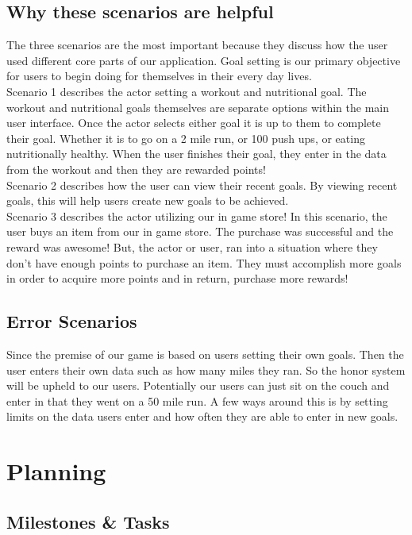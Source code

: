 \documentclass[a4paper]{article}
\begin{document}
\subsection{Why these scenarios are helpful}
The three scenarios are the most important because they discuss how the user used different core parts of our application. Goal setting is our primary objective for users to begin doing for themselves in their every day lives. \newline
\\ Scenario 1 describes the actor setting a workout and nutritional goal. The workout and nutritional goals themselves are separate options within the main user interface. Once the actor selects either goal it is up to them to complete their goal. Whether it is to go on a 2 mile run, or 100 push ups, or eating nutritionally healthy. When the user finishes their goal, they enter in the data from the workout and then they are rewarded points! \newline
\\ Scenario 2 describes how the user can view their recent goals. By viewing recent goals, this will help users create new goals to be achieved.\newline 
\\ Scenario 3 describes the actor utilizing our in game store! In this scenario, the user buys an item from our in game store. The purchase was successful and the reward was awesome! But, the actor or user, ran into a situation where they don't have enough points to purchase an item. They must accomplish more goals in order to acquire more points and in return, purchase more rewards! 

\subsection{Error Scenarios}
Since the premise of our game is based on users setting their own goals. Then the user enters their own data such as how many miles they ran. So the honor system will be upheld to our users. Potentially our users can just sit on the couch and enter in that they went on a 50 mile run. A few ways around this is by setting limits on the data users enter and how often they are able to enter in new goals. 

\section{Planning}
\subsection{Milestones \& Tasks}
\end{document}

